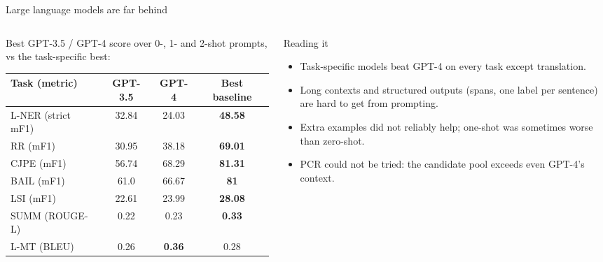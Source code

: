 \documentclass[aspectratio=169,11pt]{beamer}
\begin{document}
\begin{frame}{Large language models are far behind}
  \begin{columns}[T]
    \begin{column}{0.56\textwidth}
      \footnotesize
      Best GPT-3.5 / GPT-4 score over 0-, 1- and 2-shot prompts, vs the task-specific best:
      \vspace{1mm}

      \begin{tabular}{@{}lccc@{}}
        \toprule
        Task (metric) & GPT-3.5 & GPT-4 & Best baseline\\
        \midrule
        L-NER (strict mF1) & 32.84 & 24.03 & \textbf{48.58}\\
        RR (mF1) & 30.95 & 38.18 & \textbf{69.01}\\
        CJPE (mF1) & 56.74 & 68.29 & \textbf{81.31}\\
        BAIL (mF1) & 61.0 & 66.67 & \textbf{81}\\
        LSI (mF1) & 22.61 & 23.99 & \textbf{28.08}\\
        SUMM (ROUGE-L) & 0.22 & 0.23 & \textbf{0.33}\\
        L-MT (BLEU) & 0.26 & \textbf{0.36} & 0.28\\
        \bottomrule
      \end{tabular}
    \end{column}
    \begin{column}{0.4\textwidth}
      \begin{exampleblock}{Reading it}
        \small
        \begin{itemize}
          \item Task-specific models beat GPT-4 on every task except translation.
          \item Long contexts and structured outputs (spans, one label per sentence) are hard to get from prompting.
          \item Extra examples did not reliably help; one-shot was sometimes worse than zero-shot.
          \item PCR could not be tried: the candidate pool exceeds even GPT-4's context.
        \end{itemize}
      \end{exampleblock}
    \end{column}
  \end{columns}
\end{frame}
\end{document}
